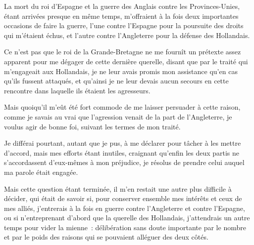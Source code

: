 \documentclass[french,twoside]{book} %
\begin{document}
\noindent La mort du roi d’Espagne et la guerre des Anglais contre les Provinces-Unies, étant arrivées presque en même temps, m’offraient à la fois deux importantes occasions de faire la guerre, l’une contre l’Espagne pour la poursuite des droits qui m’étaient échus, et l’autre contre l’Angleterre pour la défense des Hollandais.\par
Ce n’est pas que le roi de la Grande-Bretagne ne me fournît un prétexte assez apparent pour me dégager de cette dernière querelle, disant que par le traité qui m’engageait aux Hollandais, je ne leur avais promis mon assistance qu’en cas qu’ils fussent attaqués, et qu’ainsi je ne leur devais aucun secours en cette rencontre dans laquelle ils étaient les agresseurs.\par
Mais quoiqu’il m’eût été fort commode de me laisser persuader à cette raison, comme je savais au vrai que l’agression venait de la part de l’Angleterre, je voulus agir de bonne foi, suivant les termes de mon traité.\par
Je différai pourtant, autant que je pus, à me déclarer pour tâcher à les mettre d’accord, mais mes efforts étant inutiles, craignant qu’enfin les deux partis ne s’accordassent d’eux-mêmes à mon préjudice, je résolus de prendre celui auquel ma parole était engagée.\par
Mais cette question étant terminée, il m’en restait une autre plus difficile à décider, qui était de savoir si, pour conserver ensemble mes intérêts et ceux de mes alliés, j’entrerais à la fois en guerre contre l’Angleterre et contre l’Espagne, ou si n’entreprenant d’abord que la querelle des Hollandais, j’attendrais un autre temps pour vider la mienne : délibération sans doute importante par le nombre et par le poids des raisons qui se pouvaient alléguer des deux côtés.\par
\end{document}
